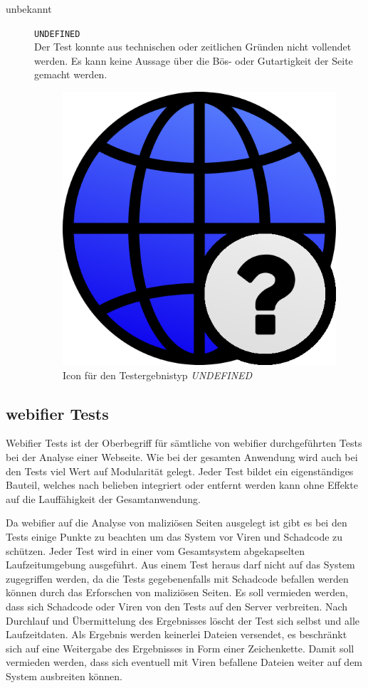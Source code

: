 \begin{description}
	\item[unbekannt] \hfill \texttt{UNDEFINED} \\
	Der Test konnte aus technischen oder zeitlichen Gründen nicht vollendet werden.
	Es kann keine Aussage über die Bös- oder Gutartigkeit der Seite gemacht werden.
	\begin{figure}[H]
		\centering
		\includegraphics[scale=0.2]{images/webifier-undefined}
		\caption{Icon für den Testergebnistyp \textit{UNDEFINED}}
	\end{figure}
\end{description}

\subsection{webifier Tests}
Webifier Tests ist der Oberbegriff für sämtliche von webifier durchgeführten Tests bei der Analyse einer Webseite. Wie bei der gesamten Anwendung wird auch bei den Tests viel Wert auf Modularität gelegt. Jeder Test bildet ein eigenständiges Bauteil, welches nach belieben integriert oder entfernt werden kann ohne Effekte auf die Lauffähigkeit der Gesamtanwendung.

Da webifier auf die Analyse von maliziösen Seiten ausgelegt ist gibt es bei den Tests einige Punkte zu beachten um das System vor Viren und Schadcode zu schützen.
Jeder Test wird in einer vom Gesamtsystem abgekapselten Laufzeitumgebung ausgeführt. Aus einem Test heraus darf nicht auf das System zugegriffen werden, da die Tests gegebenenfalls mit Schadcode befallen werden können durch das Erforschen von maliziösen Seiten. Es soll vermieden werden, dass sich Schadcode oder Viren von den Tests auf den Server verbreiten. Nach Durchlauf und Übermittelung des Ergebnisses löscht der Test sich selbst und alle Laufzeitdaten. Als Ergebnis werden keinerlei Dateien versendet, es beschränkt sich auf eine Weitergabe des Ergebnisses in Form einer Zeichenkette. Damit soll vermieden werden, dass sich eventuell mit Viren befallene Dateien weiter auf dem System ausbreiten können.

